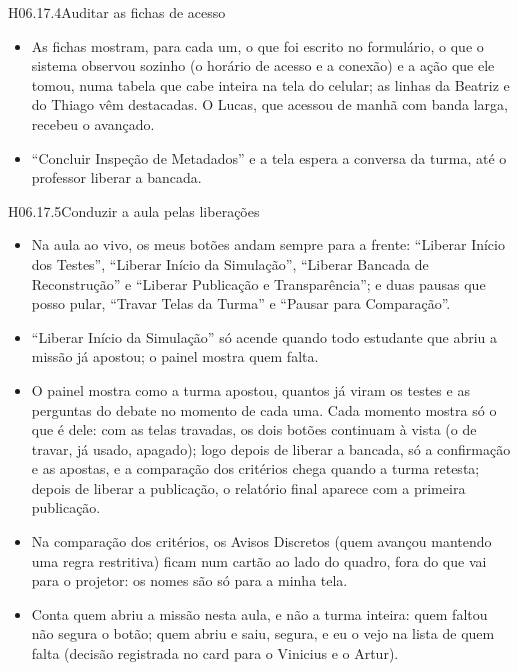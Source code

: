 \begin{historia}{H06.17.4}{Auditar as fichas de acesso}{\pronto}
\aceite
\begin{itemize}
  \item As fichas mostram, para cada um, o que foi escrito no formulário, o
    que o sistema observou sozinho (o horário de acesso e a conexão) e a ação
    que ele tomou, numa tabela que cabe inteira na tela do celular; as linhas
    da Beatriz e do Thiago vêm destacadas. O Lucas, que acessou de manhã com
    banda larga, recebeu o avançado.
  \item \enquote{Concluir Inspeção de Metadados} e a tela espera a conversa
    da turma, até o professor liberar a bancada.
\end{itemize}
\end{historia}

\begin{historia}{H06.17.5}{Conduzir a aula pelas liberações}{\pronto}
\aceite
\begin{itemize}
  \item Na aula ao vivo, os meus botões andam sempre para a frente:
    \enquote{Liberar Início dos Testes}, \enquote{Liberar Início da
    Simulação}, \enquote{Liberar Bancada de Reconstrução} e \enquote{Liberar
    Publicação e Transparência}; e duas pausas que posso pular,
    \enquote{Travar Telas da Turma} e \enquote{Pausar para Comparação}.
  \item \enquote{Liberar Início da Simulação} só acende quando todo
    estudante que abriu a missão já apostou; o painel mostra quem falta.
  \item O painel mostra como a turma apostou, quantos já viram os testes e as
    perguntas do debate no momento de cada uma. Cada momento mostra só o que
    é dele: com as telas travadas, os dois botões continuam à vista (o de
    travar, já usado, apagado); logo depois de liberar a bancada, só a
    confirmação e as apostas, e a comparação dos critérios chega quando a
    turma retesta; depois de liberar a publicação, o relatório final aparece
    com a primeira publicação.
  \item Na comparação dos critérios, os Avisos Discretos (quem avançou
    mantendo uma regra restritiva) ficam num cartão ao lado do quadro, fora
    do que vai para o projetor: os nomes são só para a minha tela.
  \item Conta quem abriu a missão nesta aula, e não a turma inteira: quem
    faltou não segura o botão; quem abriu e saiu, segura, e eu o vejo na
    lista de quem falta (decisão registrada no card para o Vinicius e o
    Artur).
\end{itemize}
\end{historia}

